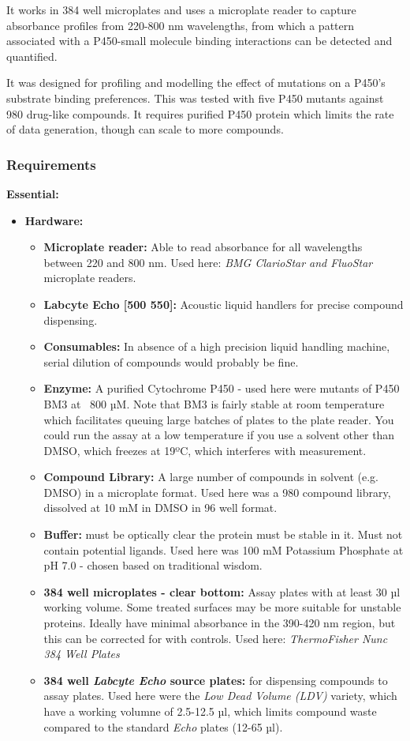 \documentclass{article}
\begin{document}
It works in 384 well microplates and uses a microplate reader to capture absorbance profiles from 220-800 nm wavelengths, from which a pattern associated with a P450-small molecule binding interactions can be detected and quantified.  

It was designed for profiling and modelling the effect of mutations on a P450's substrate binding preferences.
This was tested with five P450 mutants against 980 drug-like compounds.
It requires purified P450 protein which limits the rate of data generation, though can scale to more compounds.


\subsubsection{Requirements}

\textbf{Essential:}

\begin{itemize}
\item \textbf{Hardware:}
	\begin{itemize}
	\item \textbf{Microplate reader:} Able to read absorbance for all wavelengths between 220 and 800 nm.
		Used here: \textit{BMG ClarioStar and FluoStar} microplate readers.
	\item \textbf{Labcyte Echo [500 550]:} Acoustic liquid handlers for precise compound dispensing.
\item \textbf{Consumables:}
	In absence of a high precision liquid handling machine, serial dilution of compounds would probably be fine.
	\item \textbf{Enzyme:} A purified Cytochrome P450 - used here were mutants of P450 BM3 at ~800 µM. 
	Note that BM3 is fairly stable at room temperature which facilitates queuing large batches of plates to the plate reader.
	You could run the assay at a low temperature if you use a solvent other than DMSO, which freezes at 19ºC, which interferes with measurement.
	\item \textbf{Compound Library:} A large number of compounds in solvent (e.g. DMSO) in a microplate format.
	Used here was a 980 compound library, dissolved at 10 mM in DMSO in 96 well format.
	\item \textbf{Buffer:} must be optically clear the protein must be stable in it.
	Must not contain potential ligands.
	Used here was 100 mM Potassium Phosphate at pH 7.0 - chosen based on traditional wisdom.
	\item \textbf{384 well microplates - clear bottom:}
	Assay plates with at least 30 µl working volume. 
	Some treated surfaces may be more suitable for unstable proteins.
	Ideally have minimal absorbance in the 390-420 nm region, but this can be corrected for with controls.
	Used here: \textit{ThermoFisher Nunc 384 Well Plates}
	\item \textbf{384 well \textit{Labcyte Echo} source plates:} for dispensing compounds to assay plates. 
	Used here were the \textit{Low Dead Volume (LDV)} variety, which have a working volumne of 2.5-12.5 µl, 
	which limits compound waste compared to the standard \textit{Echo} plates (12-65 µl).
	\end{itemize}
\end{itemize}
\end{document}
